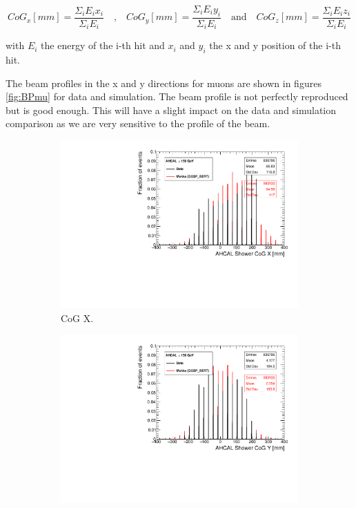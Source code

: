 \begin{equation}
  CoG_x [mm] = \frac{\Sigma_i E_i x_i}{\Sigma_i E_i} \quad \text{,} \quad CoG_y [mm] = \frac{\Sigma_i E_i y_i}{\Sigma_i E_i} \quad \text{and} \quad CoG_z [mm] = \frac{\Sigma_i E_i z_i}{\Sigma_i E_i}
\end{equation}

\noindent with $E_i$ the energy of the i-th hit and $x_i$ and $y_i$ the x and y position of the i-th hit.

The beam profiles in the x and y directions for muons are shown in figures \ref{fig:BPmu} for data and simulation. The beam profile is not perfectly reproduced but is good enough. This will have a slight impact on the data and simulation comparison as we are very sensitive to the
profile of the beam.

\begin{figure}[htbp!]
  \centering
  \begin{subfigure}[t]{0.49\textwidth}
    \includegraphics[width=1.\linewidth]{../Thesis_Plots/Timing/Muons/Plots/BeamProfileX.pdf}
    \caption{CoG X.} \label{fig:mu150GeVX}
  \end{subfigure}
  \hfill
  \begin{subfigure}[t]{0.49\textwidth}
    \includegraphics[width=1.\linewidth]{../Thesis_Plots/Timing/Muons/Plots/BeamProfileY.pdf}

\end{subfigure}
\end{figure}
